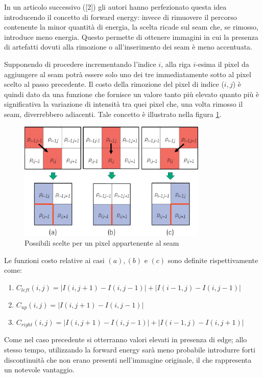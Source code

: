 \documentclass[12pt,a4paper]{report}
\theoremstyle{plain}
\theoremstyle{definition}
\begin{document}
In un articolo successivo ([2]) gli autori hanno perfezionato questa idea introducendo il concetto di forward energy: invece di rimuovere il percorso contenente la minor quantità di energia, la scelta ricade sul seam che, se rimosso, introduce meno energia. Questo permette di ottenere immagini in cui la presenza di artefatti dovuti alla rimozione o all'inserimento dei seam è meno accentuata.

Supponendo di procedere incrementando l'indice $i$, alla riga $i$-esima il pixel da aggiungere al seam potrà essere solo uno dei tre immediatamente sotto al pixel scelto al passo precedente. Il costo della rimozione del pixel di indice ($i,j$) è quindi dato da una funzione che  fornisce un valore tanto più elevato quanto più è significativa la variazione di intensità tra quei pixel che, una volta rimosso il seam, diverrebbero adiacenti. Tale concetto è illustrato nella figura \ref{choice}.

\begin{figure}[h]
\centering
\includegraphics[width=9cm]{cost}
\caption{Possibili scelte per un pixel appartenente al seam}
\label{choice}
\end{figure}

Le funzioni costo relative ai casi $(a),(b)$ e $(c)$ sono definite rispettivamente come: 
\begin{enumerate}[$a$)]
\item $C_{left} (i, j) = |I(i, j + 1) - I(i, j - 1)| + |I(i - 1, j) - I(i, j - 1)| $
\item $C_{up} (i, j) = |I(i, j + 1) - I(i, j - 1)|$
\item $ C_{right} (i, j) = |I(i, j + 1) - I(i, j - 1)| + |I(i - 1, j) - I(i, j + 1)|$
\end{enumerate}

Come nel caso precedente si otterranno valori elevati in presenza di edge; allo stesso tempo, utilizzando la forward energy sarà meno probabile introdurre forti discontinuità che non erano presenti nell'immagine originale, il che rappresenta un notevole vantaggio.
\end{document}
